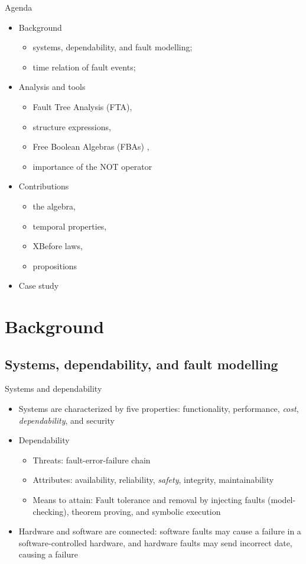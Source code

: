 \documentclass{beamer}
\def\FTA{Fault Tree Analysis (FTA)\gdef\FTA{FTA\xspace}\xspace}
\def\FBA{%
	Free Boolean Algebra (FBA)%
	\gdef\FBA{FBA\xspace}%
	\gdef\FBAs{FBAs\xspace}%
	\gdef\iFBA{an FBA\xspace}%
	\xspace%
}
\def\FBAs{%
	Free Boolean Algebras (FBAs)%
	\gdef\FBA{FBA\xspace}%
	\gdef\FBAs{FBAs\xspace}%
	\gdef\iFBA{an FBA\xspace}%
	\xspace%
}
\def\iFBA{%
	a Free Boolean Algebra (FBA)%
	\gdef\FBA{FBA\xspace}%
	\gdef\FBAs{FBAs\xspace}%
	\gdef\iFBA{an FBA\xspace}%
	\xspace%
}
\begin{document}
\begin{frame}{Agenda}
	\begin{itemize}
		\item Background
		\begin{itemize}
			\item systems, dependability, and fault modelling; 
			\item time relation of fault events;
		\end{itemize}
		\item Analysis and tools
		\begin{itemize}
			\item \FTA, 
			\item structure expressions, 
			\item \FBAs, 
			\item importance of the NOT operator
		\end{itemize}
		\item Contributions
		\begin{itemize}
			\item the algebra, 
			\item temporal properties, 
			\item XBefore laws, 
			\item propositions
		\end{itemize}
		\item Case study
	\end{itemize}
\end{frame}

\section{Background}

\subsection{Systems, dependability, and fault modelling}

\begin{frame}{Systems and dependability}
	\begin{itemize}
		\item Systems are characterized by five properties: functionality, performance, \emph{cost}, \emph{dependability}, and security
		\item Dependability
		\begin{itemize}
			\item Threats: fault-error-failure chain
			\item Attributes: availability, reliability, \emph{safety}, integrity, maintainability
			\item Means to attain: Fault tolerance and removal by injecting faults (model-checking), theorem proving, and symbolic execution
		\end{itemize}
		\item Hardware and software are connected: software faults may cause a failure in a software-controlled hardware, and hardware faults may send incorrect date, causing a failure
	\end{itemize}
\end{frame}
\end{document}
